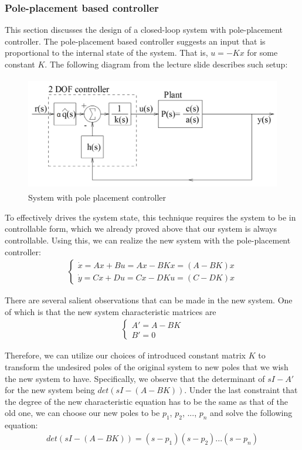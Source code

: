 \documentclass [12pt,letterpaper]{exam}
\begin{document}
\subsubsection{Pole-placement based controller}
This section discusses the design of a closed-loop system with pole-placement controller. The pole-placement based controller suggests an input that is proportional to the internal state of the system. That is, $u = -Kx$ for some constant $K$. The following diagram from the lecture slide describes such setup:
\begin{figure}[H]
  \centering
    \includegraphics[width=12.76cm, height=5cm]{pl_diagram} 
  \caption{System with pole placement controller}
  \label{fig:pl_diagram}
\end{figure}

To effectively drives the system state, this technique requires the system to be in controllable form, which we already proved above that our system is always controllable. Using this, we can realize the new system with the pole-placement controller:
\begin{align}
\begin{cases}
\dot{x} = Ax + Bu = Ax - BKx = (A - BK)x \\
\dot{y} = Cx + Du = Cx - DKu = (C - DK)x
\end{cases}
\end{align}

There are several salient observations that can be made in the new system. One of which is that the new system characteristic matrices are
\begin{align}
\begin{cases}
A' = A - BK \\
B' = 0
\end{cases}
\end{align}

Therefore, we can utilize our choices of introduced constant matrix $K$ to transform the undesired poles of the original system to new poles that we wish the new system to have. Specifically, we observe that the determinant of $sI - A'$ for the new system being $det(sI - (A - BK))$. Under the last constraint that the degree of the new characteristic equation has to be the same as that of the old one, we can choose our new poles to be $p_1$, $p_2$, ..., $p_n$ and solve the following equation:
\begin{align}
det(sI - (A - BK)) = (s - p_1)(s - p_2)...(s - p_n)
\end{align}
\end{document}
